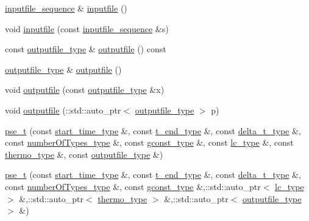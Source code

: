 \begin{DoxyCompactItemize}
\item 
\hyperlink{classpse__t_a4256607256aa600165964a3a6d7b4a00}{inputfile\-\_\-sequence} \& \hyperlink{classpse__t_ab2ad9a71f6a781c2e7fcbe42a708cd7c}{inputfile} ()
\item 
void \hyperlink{classpse__t_acf62869d9c38c6b59cb858bd82433ebc}{inputfile} (const \hyperlink{classpse__t_a4256607256aa600165964a3a6d7b4a00}{inputfile\-\_\-sequence} \&s)
\item 
const \hyperlink{classpse__t_ae86d42dbfdd42a4d53733b6b11b5f875}{outputfile\-\_\-type} \& \hyperlink{classpse__t_a422c3cc4009f845d32b4246ff34e7507}{outputfile} () const 
\item 
\hyperlink{classpse__t_ae86d42dbfdd42a4d53733b6b11b5f875}{outputfile\-\_\-type} \& \hyperlink{classpse__t_a51b629a444eb46dead05e358217580fa}{outputfile} ()
\item 
void \hyperlink{classpse__t_a9820d2ff1eb7021c87507b5dbe97569f}{outputfile} (const \hyperlink{classpse__t_ae86d42dbfdd42a4d53733b6b11b5f875}{outputfile\-\_\-type} \&x)
\item 
void \hyperlink{classpse__t_a57dce4a2d7e11de9c53dd050ca3a02ae}{outputfile} (\-::std\-::auto\-\_\-ptr$<$ \hyperlink{classpse__t_ae86d42dbfdd42a4d53733b6b11b5f875}{outputfile\-\_\-type} $>$ p)
\item 
\hyperlink{classpse__t_abf13db7637cd0458dd528641e5c0236d}{pse\-\_\-t} (const \hyperlink{classpse__t_a2b49c9d348499d75809e2b655582eb6f}{start\-\_\-time\-\_\-type} \&, const \hyperlink{classpse__t_ac4239e9fa324e53f5964848e3089fef6}{t\-\_\-end\-\_\-type} \&, const \hyperlink{classpse__t_a7af94a081ff80545fa4d069c4ba56b57}{delta\-\_\-t\-\_\-type} \&, const \hyperlink{classpse__t_a3aa6a8cc1b9642304371fb935f6e1965}{number\-Of\-Types\-\_\-type} \&, const \hyperlink{classpse__t_a86b52d56dfb0c43a023d8bda8b4a19ed}{gconst\-\_\-type} \&, const \hyperlink{classpse__t_aa6a9bda12a405c1b9fb0baecbed9a1bb}{lc\-\_\-type} \&, const \hyperlink{classpse__t_aebaae32f697fb451e7bab83078867d4e}{thermo\-\_\-type} \&, const \hyperlink{classpse__t_ae86d42dbfdd42a4d53733b6b11b5f875}{outputfile\-\_\-type} \&)
\item 
\hyperlink{classpse__t_a5a5effaf61883042a01c631c2cd32aee}{pse\-\_\-t} (const \hyperlink{classpse__t_a2b49c9d348499d75809e2b655582eb6f}{start\-\_\-time\-\_\-type} \&, const \hyperlink{classpse__t_ac4239e9fa324e53f5964848e3089fef6}{t\-\_\-end\-\_\-type} \&, const \hyperlink{classpse__t_a7af94a081ff80545fa4d069c4ba56b57}{delta\-\_\-t\-\_\-type} \&, const \hyperlink{classpse__t_a3aa6a8cc1b9642304371fb935f6e1965}{number\-Of\-Types\-\_\-type} \&, const \hyperlink{classpse__t_a86b52d56dfb0c43a023d8bda8b4a19ed}{gconst\-\_\-type} \&,\-::std\-::auto\-\_\-ptr$<$ \hyperlink{classpse__t_aa6a9bda12a405c1b9fb0baecbed9a1bb}{lc\-\_\-type} $>$ \&,\-::std\-::auto\-\_\-ptr$<$ \hyperlink{classpse__t_aebaae32f697fb451e7bab83078867d4e}{thermo\-\_\-type} $>$ \&,\-::std\-::auto\-\_\-ptr$<$ \hyperlink{classpse__t_ae86d42dbfdd42a4d53733b6b11b5f875}{outputfile\-\_\-type} $>$ \&)

\end{DoxyCompactItemize}
